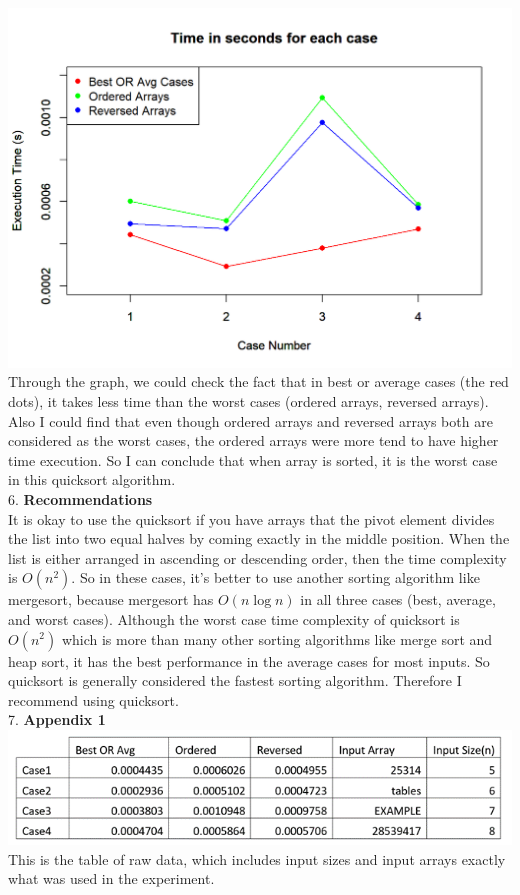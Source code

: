 \documentclass{article}
\begin{document}
\includegraphics[scale = 0.7]{graph} \\
Through the graph, we could check the fact that in best or average cases (the red dots), it takes less time than the worst cases (ordered arrays, reversed arrays). Also I could find that even though ordered arrays and reversed arrays both are considered as the worst cases, the ordered arrays were more tend to have higher time execution. So I can conclude that when array is sorted, it is the worst case in this quicksort algorithm. \\

6. \textbf{Recommendations} \\ 
It is okay to use the quicksort if you have arrays that the pivot element divides the list into two equal halves by coming exactly in the middle position. When the list is either arranged in ascending or descending order, then the time complexity is $O(n^2)$. So in these cases, it's better to use another sorting algorithm like mergesort, because mergesort has $O(n\log n)$ in all three cases (best, average, and worst cases). Although the worst case time complexity of quicksort is $O(n^2)$ which is more than many other sorting algorithms like merge sort and heap sort, it has the best performance in the average cases for most inputs. So quicksort is generally considered the fastest sorting algorithm. Therefore I recommend using quicksort. \\

7. \textbf{Appendix 1} \\ 
\includegraphics[scale = 0.7]{table} 
This is the table of raw data, which includes input sizes and input arrays exactly what was used in the experiment. \\
\end{document}
